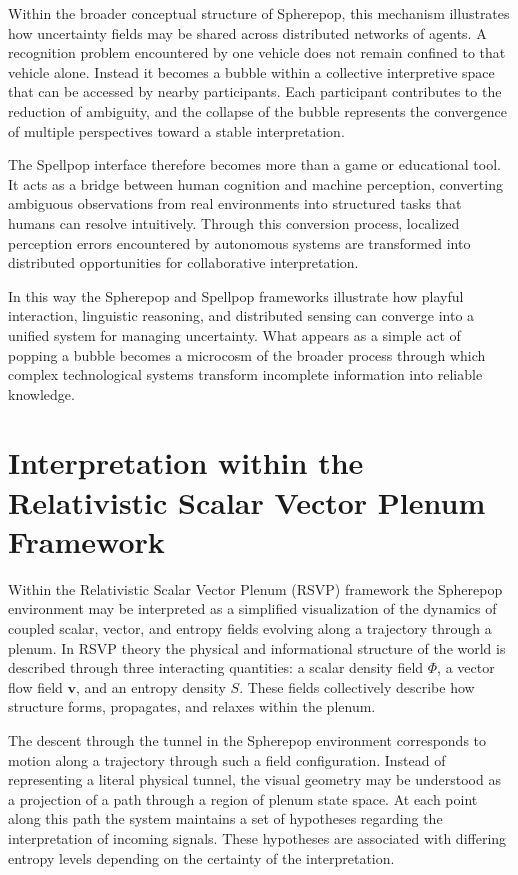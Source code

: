 \documentclass[11pt]{article}
\begin{document}
Within the broader conceptual structure of Spherepop, this mechanism illustrates how uncertainty fields may be shared across distributed networks of agents. A recognition problem encountered by one vehicle does not remain confined to that vehicle alone. Instead it becomes a bubble within a collective interpretive space that can be accessed by nearby participants. Each participant contributes to the reduction of ambiguity, and the collapse of the bubble represents the convergence of multiple perspectives toward a stable interpretation.

The Spellpop interface therefore becomes more than a game or educational tool. It acts as a bridge between human cognition and machine perception, converting ambiguous observations from real environments into structured tasks that humans can resolve intuitively. Through this conversion process, localized perception errors encountered by autonomous systems are transformed into distributed opportunities for collaborative interpretation.

In this way the Spherepop and Spellpop frameworks illustrate how playful interaction, linguistic reasoning, and distributed sensing can converge into a unified system for managing uncertainty. What appears as a simple act of popping a bubble becomes a microcosm of the broader process through which complex technological systems transform incomplete information into reliable knowledge.

\section{Interpretation within the Relativistic Scalar Vector Plenum Framework}

Within the Relativistic Scalar Vector Plenum (RSVP) framework the Spherepop environment may be interpreted as a simplified visualization of the dynamics of coupled scalar, vector, and entropy fields evolving along a trajectory through a plenum. In RSVP theory the physical and informational structure of the world is described through three interacting quantities: a scalar density field $\Phi$, a vector flow field $\mathbf{v}$, and an entropy density $S$. These fields collectively describe how structure forms, propagates, and relaxes within the plenum.

The descent through the tunnel in the Spherepop environment corresponds to motion along a trajectory through such a field configuration. Instead of representing a literal physical tunnel, the visual geometry may be understood as a projection of a path through a region of plenum state space. At each point along this path the system maintains a set of hypotheses regarding the interpretation of incoming signals. These hypotheses are associated with differing entropy levels depending on the certainty of the interpretation.
\end{document}
